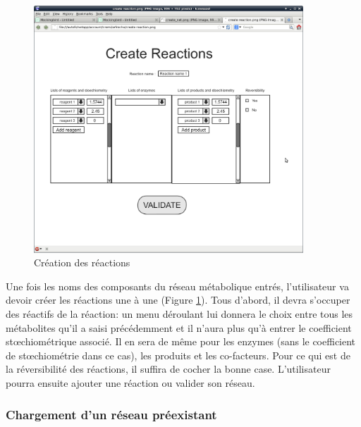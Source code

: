 \begin{figure}[!ht]
	\begin{center}
  		\includegraphics[width=0.90\textwidth]{create_reaction.png}  
  		\caption{Création des réactions}
  		\label{reactions}
	\end{center}
\end{figure}

Une fois les noms des composants du réseau métabolique entrés, l'utilisateur va devoir créer les réactions une à une (Figure \ref{reactions}). Tous d'abord, il devra s'occuper des réactifs de la réaction: un menu déroulant lui donnera le choix entre tous les métabolites qu'il a saisi précédemment et il n'aura plus qu'à entrer le coefficient stœchiométrique associé. Il en sera de même pour les enzymes (sans le coefficient de stœchiométrie dans ce cas), les produits et les co-facteurs. Pour ce qui est de la réversibilité des réactions, il suffira de cocher la bonne case. L'utilisateur pourra ensuite ajouter une réaction ou valider son réseau. 

\pagebreak

\subsubsection{Chargement d'un réseau préexistant}

